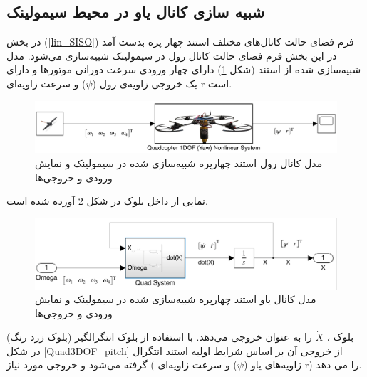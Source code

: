\subsection{شبیه سازی کانال یاو در محیط سیمولینک}
در بخش
(\ref{lin_SISO})
فرم فضای حالت کانال‌های مختلف استند چهار پره بدست آمد در این بخش فرم فضای حالت کانال رول در سیمولینک شبیه‌سازی می‌شود.
مدل شبیه‌سازی شده از استند (شکل \ref{yaw_simulink}) دارای چهار ورودی سرعت دورانی موتورها  و دارای یک خروجی زاویه‌ی رول ($\psi$) و  سرعت زاویه‌ای r است.
\begin{figure}[H]
	\includegraphics[width=16cm]{../Figures/QuadSimulation/yaw_Stand_Model.png}
	\centering
	\vspace*{-15mm}
	\caption{مدل کانال رول استند چهارپره شبیه‌سازی شده در سیمولینک و نمایش ورودی و خروجی‌ها}
	\label{yaw_simulink}
\end{figure}

نمایی از داخل بلوک
در شکل \ref{Quad1DOF_yaw} آورده شده است.
\begin{figure}[H]
	\includegraphics[width=16cm]{../Figures/QuadSimulation/yaw_Integrator.png}
	\centering
	\vspace*{-15mm}
	\caption{مدل کانال یاو استند چهارپره شبیه‌سازی شده در سیمولینک و نمایش ورودی و خروجی‌ها}
	\label{Quad1DOF_yaw}
\end{figure}
بلوک
،
$\dot X$ را به عنوان خروجی می‌دهد. با استفاده از بلوک انتگرالگیر (بلوک زرد رنگ) در شکل
\ref{Quad3DOF_pitch}
از خروجی آن بر اساس شرایط اولیه استند انتگرال گرفته می‌شود و خروجی مورد نیاز ( زاویه‌های یاو ($\psi$) و سرعت زاویه‌ای‌
r)
را می دهد.

